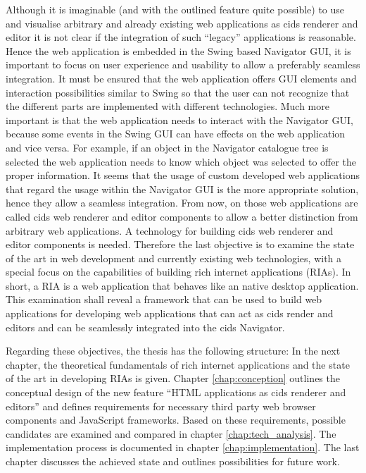 Although it is imaginable (and with the outlined feature quite possible) to use and visualise arbitrary and already existing web applications as cids renderer and editor it is not clear if the integration of such \enquote{legacy} applications is reasonable.
Hence the web application is embedded in the Swing based Navigator GUI, it is important to focus on user experience and usability to allow a preferably seamless integration.
It must be ensured that the web application offers GUI elements and interaction possibilities similar to Swing so that the user can not recognize that the different parts are implemented with different technologies.
Much more important is that the web application needs to interact with the Navigator GUI, because some events in the Swing GUI can have effects on the web application and vice versa.
For example, if an object in the Navigator catalogue tree is selected the web application needs to know which object was selected to offer the proper information.
It seems that the usage of custom developed web applications that regard the usage within the Navigator GUI is the more appropriate solution, hence they allow a seamless integration. From now, on those web applications are called cids web renderer and editor components to allow a better distinction from arbitrary web applications. 
A technology for building cids web renderer and editor components is needed.
Therefore the last objective is to examine the state of the art in web development and currently existing web technologies, with a special focus on the capabilities of building rich internet applications (RIAs).
In short, a RIA is a web application that behaves like an native desktop application.
This examination shall reveal a framework that can be used to build web applications for developing web applications that can act as cids render and editors and can be seamlessly integrated into the cids Navigator.

Regarding these objectives, the thesis has the following structure: In the next chapter, the theoretical fundamentals of rich internet applications and the state of the art in developing RIAs is given.
Chapter \ref{chap:conception} outlines the conceptual design of the new feature \enquote{HTML applications as cids renderer and editors} and defines requirements for necessary third party web browser components and JavaScript frameworks.
Based on these requirements, possible candidates are examined and compared in chapter \ref{chap:tech_analysis}.
The  implementation process is documented in chapter \ref{chap:implementation}.
The last chapter discusses the achieved state and outlines possibilities for future work.
 
